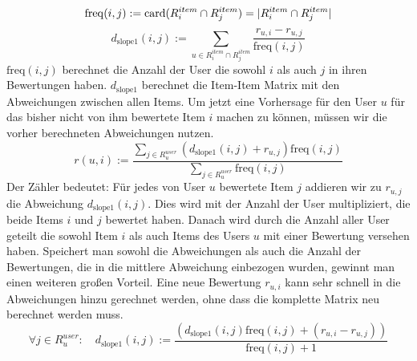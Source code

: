 \begin{equation}
\mathrm{freq}(i,j) := \mathrm{card}(R^{item}_{i} \cap R^{item}_{j})=|R^{item}_{i} \cap R^{item}_{j}|\\
\end{equation}
\begin{equation}
 d_{\mathrm{slope1}}(i,j) := \sum\limits_{u\in R^{item}_{i} \cap R^{item}_{j}}\dfrac{r_{u,i}-r_{u,j}}  {\mathrm{freq}(i,j)} 	\label{deviation}
\end{equation}	
$\mathrm{freq}(i,j)$ berechnet die Anzahl der User die sowohl $i$ als auch $j$ in ihren Bewertungen haben. $d_{\mathrm{slope1}}$ berechnet die Item-Item Matrix mit den Abweichungen zwischen allen Items. 
Um jetzt eine Vorhersage für den User $u$ für das bisher nicht von ihm bewertete Item $i$ machen zu können, müssen wir die vorher berechneten Abweichungen nutzen.
\begin{equation}
 r(u,i) := \dfrac{\sum\limits_{j\in R^{user}_{u}}( d_{\mathrm{slope1}}(i,j)+r_{u,j})\mathrm{freq}(i,j)}  {\sum\limits_{j\in R^{user}_{u}}\mathrm{freq}(i,j)} 	\label{slopeone}
\end{equation}
Der Zähler bedeutet: Für jedes von User $u$ bewertete Item $j$ addieren wir zu $r_{u,j}$ die Abweichung $d_{\mathrm{slope1}}(i,j)$. Dies wird mit der Anzahl der User multipliziert, die beide Items $i$ und $j$ bewertet haben. Danach wird durch die Anzahl aller User geteilt die sowohl Item $i$ als auch Items des Users $u$ mit einer Bewertung versehen haben. Speichert man sowohl die Abweichungen als auch die Anzahl der Bewertungen, die in die mittlere Abweichung einbezogen wurden, gewinnt man einen weiteren großen Vorteil. Eine neue Bewertung $r_{u,i}$ kann sehr schnell in die Abweichungen hinzu gerechnet werden, ohne dass die komplette Matrix neu berechnet werden muss.
	\begin{equation}
\forall j\in R^{user}_{u}:\quad d_{\mathrm{slope1}}(i,j) := \dfrac{(d_{\mathrm{slope1}}(i,j)\mathrm{freq}(i,j)+(r_{u,i}-r_{u,j}))}  {\mathrm{freq}(i,j)+1} 	\label{slopeoneadd}
	\end{equation}

\clearpage
